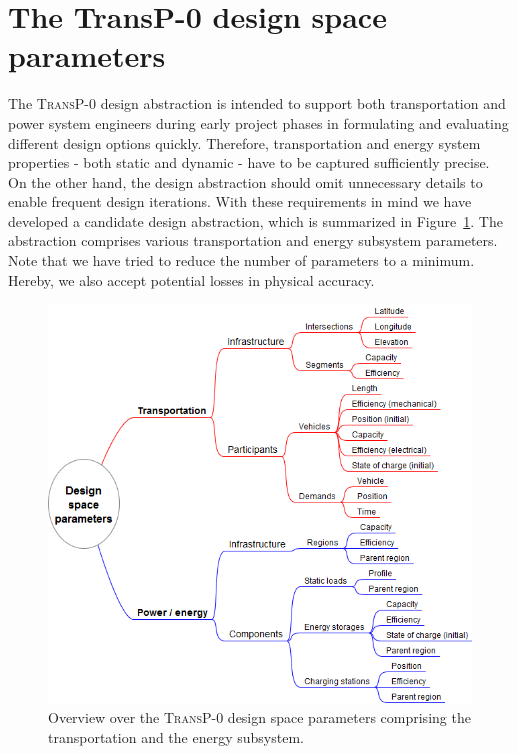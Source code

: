 \section{The \textbf{TransP-0} design space parameters}
\label{proposed_model}

The \textsc{TransP-0} design abstraction is intended to support both transportation and power system engineers during early project phases in formulating and evaluating different design options quickly. Therefore, transportation and energy system properties - both static and dynamic - have to be captured sufficiently precise. On the other hand, the design abstraction should omit unnecessary details to enable frequent design iterations. With these requirements in mind we have developed a candidate design abstraction, which is summarized in Figure~\ref{system_design}. The abstraction comprises various transportation and energy subsystem parameters. Note that we have tried to reduce the number of parameters to a minimum. Hereby, we also accept potential losses in physical accuracy.

\begin{figure}[h!]
	\includegraphics[width=\columnwidth]{./gfx/system_design.png}
	\caption{Overview over the \textsc{TransP-0} design space parameters comprising the transportation and the energy subsystem.}
	\label{system_design}
\end{figure}

